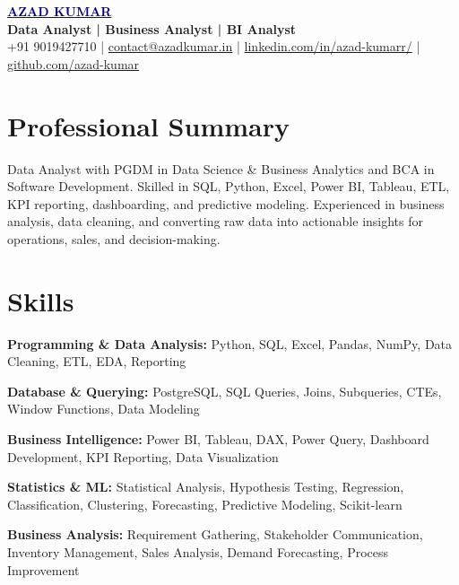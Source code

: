 \documentclass[a4paper,10pt]{article}
\newcommand{\skillrow}[2]{%
  \noindent\textbf{#1:} #2\par\vspace{1.5pt}}
\newcommand{\GITHUB}{github.com/azad-kumar}
\begin{document}
\fontsize{8.4}{9.0}\selectfont

\begin{center}
  {\Large\bfseries\color{navy}\href{http://azadkumar.in/}{\textcolor{navy}{AZAD KUMAR}}}\\[2pt]
  {\small\bfseries Data Analyst \textcolor{accent}{|} Business Analyst \textcolor{accent}{|} BI Analyst}\\[2pt]
  {\small +91 9019427710 \textcolor{accent}{|} \href{mailto:contact@azadkumar.in}{contact@azadkumar.in} \textcolor{accent}{|} \href{https://www.linkedin.com/in/azad-kumarr/}{linkedin.com/in/azad-kumarr/} \textcolor{accent}{|} \href{\GITHUB}{\GITHUB}} 
\end{center}

\section*{Professional Summary}
Data Analyst with PGDM in Data Science \& Business Analytics and BCA in Software Development. Skilled in SQL, Python, Excel, Power BI, Tableau, ETL, KPI reporting, dashboarding, and predictive modeling. Experienced in business analysis, data cleaning, and converting raw data into actionable insights for operations, sales, and decision-making.

\section*{Skills}
\skillrow{Programming \& Data Analysis}{Python, SQL, Excel, Pandas, NumPy, Data Cleaning, ETL, EDA, Reporting}
\skillrow{Database \& Querying}{PostgreSQL, SQL Queries, Joins, Subqueries, CTEs, Window Functions, Data Modeling}
\skillrow{Business Intelligence}{Power BI, Tableau, DAX, Power Query, Dashboard Development, KPI Reporting, Data Visualization}
\skillrow{Statistics \& ML}{Statistical Analysis, Hypothesis Testing, Regression, Classification, Clustering, Forecasting, Predictive Modeling, Scikit-learn}
\skillrow{Business Analysis}{Requirement Gathering, Stakeholder Communication, Inventory Management, Sales Analysis, Demand Forecasting, Process Improvement}

\end{document}
